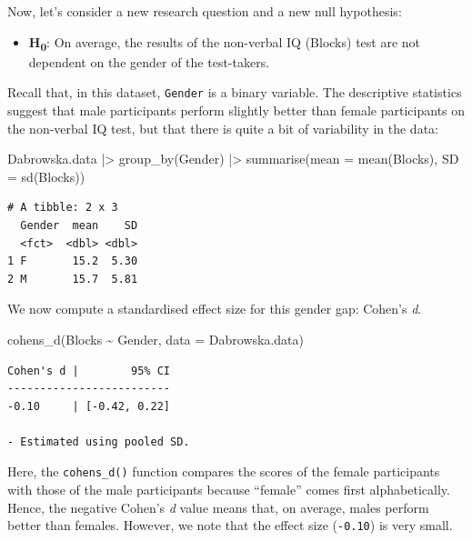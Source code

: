 \documentclass[
  letterpaper,
  DIV=11,
  numbers=noendperiod]{scrreprt}
\newenvironment{Shaded}{\begin{snugshade}}{\end{snugshade}}
\newcommand{\AttributeTok}[1]{\textcolor[rgb]{0.40,0.45,0.13}{#1}}
\newcommand{\FunctionTok}[1]{\textcolor[rgb]{0.28,0.35,0.67}{#1}}
\newcommand{\NormalTok}[1]{\textcolor[rgb]{0.00,0.23,0.31}{#1}}
\newcommand{\SpecialCharTok}[1]{\textcolor[rgb]{0.37,0.37,0.37}{#1}}
\providecommand{\tightlist}{%
  \setlength{\itemsep}{0pt}\setlength{\parskip}{0pt}}
\begin{document}
Now, let's consider a new research question and a new null hypothesis:

\begin{itemize}
\tightlist
\item
  \textbf{H\textsubscript{0}}: On average, the results of the non-verbal
  IQ (Blocks) test are not dependent on the gender of the test-takers.
\end{itemize}

Recall that, in this dataset, \texttt{Gender} is a binary variable. The
descriptive statistics suggest that male participants perform slightly
better than female participants on the non-verbal IQ test, but that
there is quite a bit of variability in the data:

\begin{Shaded}
\begin{Highlighting}[]
\NormalTok{Dabrowska.data }\SpecialCharTok{|\textgreater{}} 
  \FunctionTok{group\_by}\NormalTok{(Gender) }\SpecialCharTok{|\textgreater{}} 
  \FunctionTok{summarise}\NormalTok{(}\AttributeTok{mean =} \FunctionTok{mean}\NormalTok{(Blocks),}
            \AttributeTok{SD =} \FunctionTok{sd}\NormalTok{(Blocks))}
\end{Highlighting}
\end{Shaded}

\begin{verbatim}
# A tibble: 2 x 3
  Gender  mean    SD
  <fct>  <dbl> <dbl>
1 F       15.2  5.30
2 M       15.7  5.81
\end{verbatim}

We now compute a standardised effect size for this gender gap: Cohen's
\emph{d}.

\begin{Shaded}
\begin{Highlighting}[]
\FunctionTok{cohens\_d}\NormalTok{(Blocks }\SpecialCharTok{\textasciitilde{}}\NormalTok{ Gender, }
       \AttributeTok{data =}\NormalTok{ Dabrowska.data)}
\end{Highlighting}
\end{Shaded}

\begin{verbatim}
Cohen's d |        95% CI
-------------------------
-0.10     | [-0.42, 0.22]

- Estimated using pooled SD.
\end{verbatim}

Here, the \texttt{cohens\_d()} function compares the scores of the
female participants with those of the male participants because
``female'' comes first alphabetically. Hence, the negative Cohen's
\emph{d} value means that, on average, males perform better than
females. However, we note that the effect size (\texttt{-0.10}) is very
small.
\end{document}
